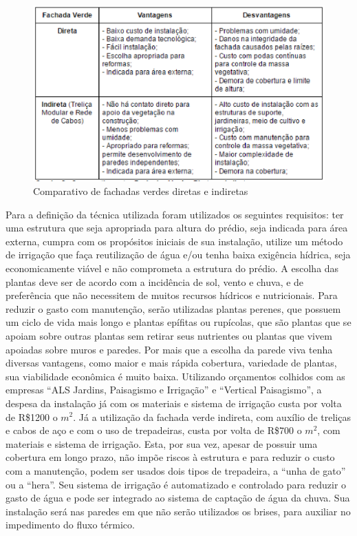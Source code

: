 \begin{figure}[!h]
\centering
\includegraphics[keepaspectratio=true,scale=1]{figuras/comparativo_de_fachadas_verdes_diretas_e_indiretas.eps}
\caption{Comparativo de fachadas verdes diretas e indiretas}
\end{figure}

Para a definição da técnica utilizada foram utilizados os seguintes requisitos: ter uma estrutura que seja apropriada para altura do prédio, seja indicada para área externa, cumpra com os propósitos iniciais de sua instalação, utilize um método de irrigação que faça reutilização de água e/ou tenha baixa exigência hídrica, seja economicamente viável e não comprometa a estrutura do prédio.
A escolha das plantas deve ser de acordo com a incidência de sol, vento e chuva, e de preferência que não necessitem de muitos recursos hídricos e nutricionais. Para reduzir o gasto com manutenção, serão utilizadas plantas perenes, que possuem um ciclo de vida mais longo e plantas epífitas ou rupícolas, que são plantas que se apoiam sobre outras plantas sem retirar seus nutrientes ou plantas que vivem apoiadas sobre muros e paredes.
Por mais que a escolha da parede viva tenha diversas vantagens, como maior e mais rápida cobertura, variedade de plantas, sua viabilidade econômica é muito baixa. Utilizando orçamentos colhidos com as empresas “ALS Jardins, Paisagismo e Irrigação” e “Vertical Paisagismo”, a despesa da instalação já com os materiais e sistema de irrigação custa por volta de R\$1200 o $m^2$. Já a utilização da fachada verde indireta, com auxílio de treliças e cabos de aço e com o uso de trepadeiras, custa por volta de R\$700 o $m^2$, com materiais e sistema de irrigação. Esta, por sua vez, apesar de possuir uma cobertura em longo prazo, não impõe riscos à estrutura e para reduzir o custo com a manutenção, podem ser usados dois tipos de trepadeira, a “unha de gato” ou a “hera”. Seu sistema de irrigação é automatizado e controlado para reduzir o gasto de água e pode ser integrado ao sistema de captação de água da chuva. Sua instalação será nas paredes em que não serão utilizados os brises, para auxiliar no impedimento do fluxo térmico.

